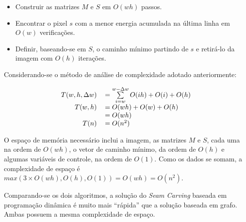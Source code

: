 \begin{itemize}
\item Construir as matrizes $M$ e $S$ em $O(wh)$ passos.
\item Encontrar o pixel $s$ com a menor energia acumulada 
    na última linha em $O(w)$ verificações.
\item Definir, baseando-se em $S$, 
    o caminho mínimo partindo de $s$ e 
    retirá-lo da imagem com $O(h)$ iterações.
\end{itemize}

Considerando-se o método de análise de complexidade 
adotado anteriormente:

\begin{equation}
\label{O-d}
\begin{tabular}{r l}
$T(w,h,\Delta{w})$ & $ = \sum \limits_{i=w}^{w - \Delta{w}}{O(ih) + O(i) + O(h)}$ \\
$T(w,h)$ & $= O(wh) + O(w) + O(h)$ \\ 
         & $= O(wh)$ \\
$T(n)$   & $= O(n^2)$ \\
\end{tabular}
\end{equation}

O espaço de memória necessário inclui a imagem, as matrizes $M$ e $S$,
cada uma na ordem de $O(wh)$,
o vetor de caminho mínimo, da ordem de $O(h)$ e algumas variáveis de 
controle, na ordem de $O(1)$.
Como os dados se somam, a complexidade de espaço é 
$max(3 \times O(wh), O(h), O(1)) = O(wh) = O(n^2)$.

Comparando-se os dois algoritmos,
a solução do {\it Seam Carving} baseada em programação dinâmica é
muito mais ``rápida'' que a solução baseada em grafo. 
Ambas possuem a mesma complexidade de espaço.





